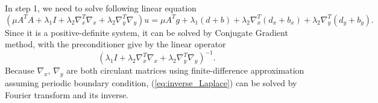 \documentclass[english]{article}\usepackage[]{graphicx}\usepackage[]{color}
\begin{document}
In step 1, we need to solve following linear equation
\begin{equation}
(\mu A^{T}A+\lambda_{1}I+\lambda_{2}\nabla_{x}^{T}\nabla_{x}+\lambda_{2}\nabla_{y}^{T}\nabla_{y})u=\mu A^{T}g+\lambda_{1}(d+b)+\lambda_{2}\nabla_{x}^{T}(d_{x}+b_{x})+\lambda_{2}\nabla_{y}^{T}(d_{y}+b_{y}).\label{eq:Laplace-equation}
\end{equation}
Since it is a positive-definite system, it can be solved by Conjugate
Gradient method, with the preconditioner give by the linear operator
\begin{equation}
(\lambda_{1}I+\lambda_{2}\nabla_{x}^{T}\nabla_{x}+\lambda_{2}\nabla_{y}^{T}\nabla_{y})^{-1}.\label{eq:inverse_Laplace}
\end{equation}
Because $\nabla_{x},\,\nabla_{y}$ are both circulant matrices using
finite-difference approximation assuming periodic boundary condition,
(\ref{eq:inverse_Laplace}) can be solved by Fourier transform and
its inverse. 
\[
\]
\[
\]
\end{document}
